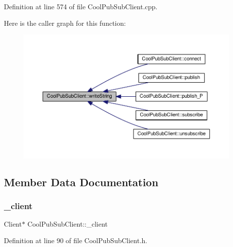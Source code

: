 Definition at line 574 of file Cool\+Pub\+Sub\+Client.\+cpp.

Here is the caller graph for this function\+:\nopagebreak
\begin{figure}[H]
\begin{center}
\leavevmode
\includegraphics[width=350pt]{class_cool_pub_sub_client_a0e3d7e776d4cf4427f9569b28868905a_icgraph}
\end{center}
\end{figure}


\subsection{Member Data Documentation}
\mbox{\label{class_cool_pub_sub_client_a487a65bafb6e3b8e9ab544b13a8878a0}} 
\subsubsection{\texorpdfstring{\+\_\+client}{\_client}}
{\footnotesize\ttfamily Client$\ast$ Cool\+Pub\+Sub\+Client\+::\+\_\+client\hspace{0.3cm}{\ttfamily [private]}}



Definition at line 90 of file Cool\+Pub\+Sub\+Client.\+h.

\mbox{\label{class_cool_pub_sub_client_aa1953b601206252a30efa5b114eb3e1a}} 
